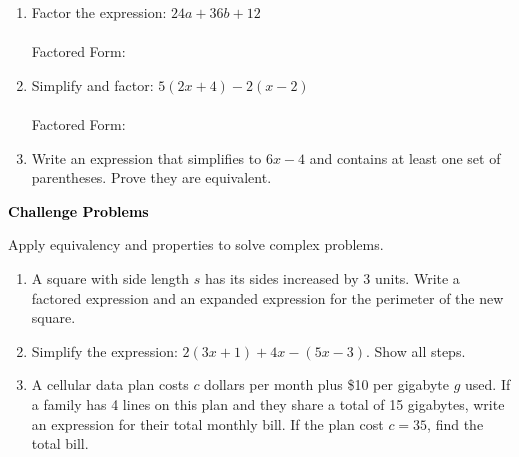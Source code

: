 \documentclass[12pt, letterpaper, fleqn]{article}
\newcommand{\blanklong}{\underline{\hspace{6.5cm}}}
\begin{document}
\vspace{3mm}

\begin{enumerate}[itemsep=1.5cm, leftmargin=0.6cm]

\item Factor the expression: $24a + 36b + 12$ \\ \\
Factored Form: \blanklong

\vspace{2cm}

\item Simplify and factor: $5(2x + 4) - 2(x - 2)$ \\ \\
Factored Form: \blanklong

\vspace{2cm}

\item Write an expression that simplifies to $6x - 4$ and contains at least one set of parentheses. Prove they are equivalent.

\vspace{2cm}

\end{enumerate}

\newpage

\begin{tcolorbox}[colback=black!10]
\large\textcolor{black}{\textbf{Challenge Problems}}
\end{tcolorbox}

\noindent
Apply equivalency and properties to solve complex problems.

\vspace{3mm}

\begin{enumerate}[itemsep=2.4cm, leftmargin=0.6cm]

\item A square with side length $s$ has its sides increased by 3 units. Write a factored expression and an expanded expression for the perimeter of the new square.

\vspace{2.3cm}

\item Simplify the expression: $2(3x + 1) + 4x - (5x - 3)$. Show all steps.

\vspace{2.3cm}

\item A cellular data plan costs $c$ dollars per month plus \$10 per gigabyte $g$ used. If a family has 4 lines on this plan and they share a total of 15 gigabytes, write an expression for their total monthly bill. If the plan cost $c = 35$, find the total bill.

\vspace{2.5cm}

\end{enumerate}
\end{document}
